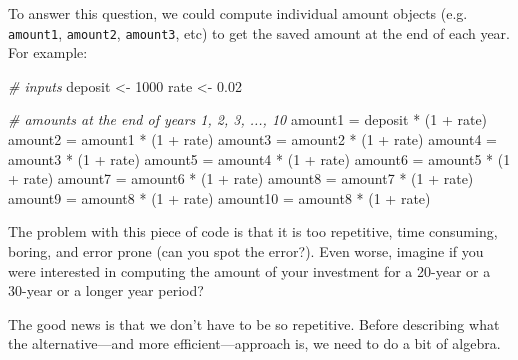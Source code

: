 \documentclass[
]{book}
\newenvironment{Shaded}{\begin{snugshade}}{\end{snugshade}}
\newcommand{\CommentTok}[1]{\textcolor[rgb]{0.56,0.35,0.01}{\textit{#1}}}
\newcommand{\DecValTok}[1]{\textcolor[rgb]{0.00,0.00,0.81}{#1}}
\newcommand{\FloatTok}[1]{\textcolor[rgb]{0.00,0.00,0.81}{#1}}
\newcommand{\NormalTok}[1]{#1}
\newcommand{\OtherTok}[1]{\textcolor[rgb]{0.56,0.35,0.01}{#1}}
\newcommand{\SpecialCharTok}[1]{\textcolor[rgb]{0.00,0.00,0.00}{#1}}
\begin{document}
To answer this question, we could compute individual amount objects (e.g.~
\texttt{amount1}, \texttt{amount2}, \texttt{amount3}, etc) to get the saved amount at the end of
each year. For example:

\begin{Shaded}
\begin{Highlighting}[]
\CommentTok{\# inputs}
\NormalTok{deposit }\OtherTok{\textless{}{-}} \DecValTok{1000}
\NormalTok{rate }\OtherTok{\textless{}{-}} \FloatTok{0.02}

\CommentTok{\# amounts at the end of years 1, 2, 3, ..., 10}
\NormalTok{amount1 }\OtherTok{=}\NormalTok{ deposit }\SpecialCharTok{*}\NormalTok{ (}\DecValTok{1} \SpecialCharTok{+}\NormalTok{ rate)}
\NormalTok{amount2 }\OtherTok{=}\NormalTok{ amount1 }\SpecialCharTok{*}\NormalTok{ (}\DecValTok{1} \SpecialCharTok{+}\NormalTok{ rate)}
\NormalTok{amount3 }\OtherTok{=}\NormalTok{ amount2 }\SpecialCharTok{*}\NormalTok{ (}\DecValTok{1} \SpecialCharTok{+}\NormalTok{ rate)}
\NormalTok{amount4 }\OtherTok{=}\NormalTok{ amount3 }\SpecialCharTok{*}\NormalTok{ (}\DecValTok{1} \SpecialCharTok{+}\NormalTok{ rate)}
\NormalTok{amount5 }\OtherTok{=}\NormalTok{ amount4 }\SpecialCharTok{*}\NormalTok{ (}\DecValTok{1} \SpecialCharTok{+}\NormalTok{ rate)}
\NormalTok{amount6 }\OtherTok{=}\NormalTok{ amount5 }\SpecialCharTok{*}\NormalTok{ (}\DecValTok{1} \SpecialCharTok{+}\NormalTok{ rate)}
\NormalTok{amount7 }\OtherTok{=}\NormalTok{ amount6 }\SpecialCharTok{*}\NormalTok{ (}\DecValTok{1} \SpecialCharTok{+}\NormalTok{ rate)}
\NormalTok{amount8 }\OtherTok{=}\NormalTok{ amount7 }\SpecialCharTok{*}\NormalTok{ (}\DecValTok{1} \SpecialCharTok{+}\NormalTok{ rate)}
\NormalTok{amount9 }\OtherTok{=}\NormalTok{ amount8 }\SpecialCharTok{*}\NormalTok{ (}\DecValTok{1} \SpecialCharTok{+}\NormalTok{ rate)}
\NormalTok{amount10 }\OtherTok{=}\NormalTok{ amount8 }\SpecialCharTok{*}\NormalTok{ (}\DecValTok{1} \SpecialCharTok{+}\NormalTok{ rate)}
\end{Highlighting}
\end{Shaded}

The problem with this piece of code is that it is too repetitive, time consuming,
boring, and error prone (can you spot the error?). Even worse, imagine if you
were interested in computing the amount of your investment for a 20-year or
a 30-year or a longer year period?

The good news is that we don't have to be so repetitive. Before describing what
the alternative---and more efficient---approach is, we need to do a bit of algebra.
\end{document}
